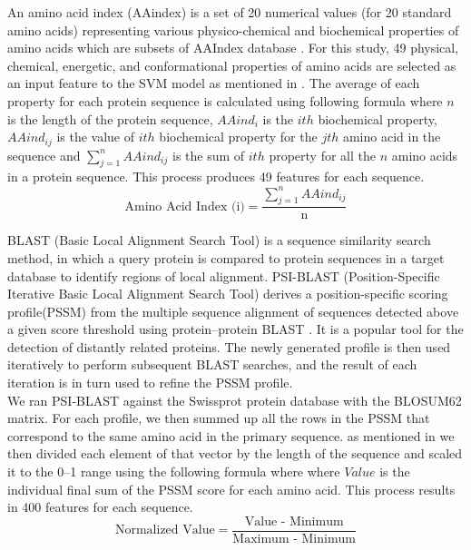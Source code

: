     An amino acid index (AAindex) is a set of 20 numerical values (for 20 standard amino acids) representing various physico-chemical 
    and biochemical properties of amino acids which are subsets of AAIndex database \cite{aaindex}. For this study, 49 physical, 
    chemical, energetic, and conformational properties of amino acids are selected as an input feature to the 
    SVM model as mentioned in \cite{mishra2014prediction}. The average of each property for each protein sequence 
    is calculated using following formula where $n$ is the length of the protein sequence, $AAind_{i}$ is the $ith$ biochemical property, $AAind_{ij}$ is the value of $ith$ 
    biochemical property for the $jth$ amino acid in the sequence and $\sum_{j=1}^{n} AAind_{ij}$ is the sum of $ith$ property for all the
    $n$ amino acids in a protein sequence. This process produces 49 features for each sequence.
    \begin{equation}
        \text{Amino Acid Index (i)} = \frac {\sum_{j=1}^{n} AAind_{ij}} {\text{n}}
    \end{equation}

    BLAST (Basic Local Alignment Search Tool) is a sequence similarity search method, in which a query protein 
    is compared to protein sequences in a target database to identify regions of local alignment. PSI-BLAST 
    (Position-Specific Iterative Basic Local Alignment Search Tool) derives a position-specific scoring profile(PSSM) 
    from the multiple sequence alignment of sequences detected above a given score threshold using 
    protein–protein BLAST \cite{bergman2007comparative}. It is a popular tool for the detection of distantly related proteins.
    The newly generated profile is then used iteratively to perform subsequent BLAST searches, 
    and the result of each iteration is in turn used to refine the PSSM profile.\\ 
    
    We ran PSI-BLAST against the Swissprot protein database with the BLOSUM62 matrix. For each profile, we then 
    summed up all the rows in the PSSM that correspond to the same amino acid in the primary sequence. as mentioned in \cite{mishra2014prediction} 
    we then divided each element  of that vector by the length of the sequence and scaled it to the 0–1 range using the following formula 
    where where $Value$ is the individual final sum of the PSSM score for each amino acid. 
    This process results in 400 features for each sequence.
    \begin{equation}
        \text{Normalized Value} = \frac {\text{Value - Minimum}} {\text{Maximum - Minimum}}
    \end{equation}


